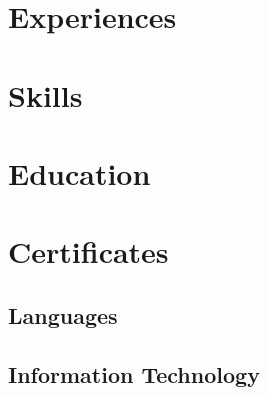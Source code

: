\documentclass{../simpler-cv}
\begin{document}
\header{}

\section{Experiences}
\begin{entrylist}
\end{entrylist}

\section{Skills}

\section{Education}

\section{Certificates}
\subsection{Languages}
\subsection{Information Technology}
\end{document}
